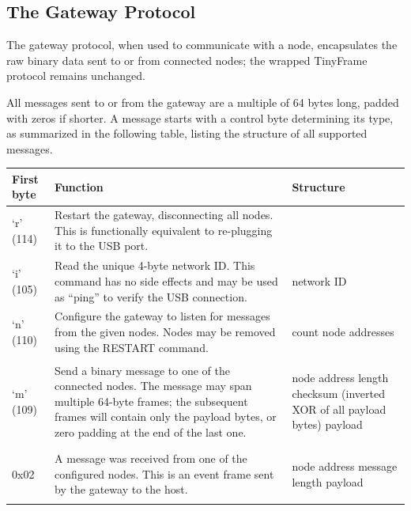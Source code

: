 \subsection{The Gateway Protocol} \label{sec:gw_protocol}

The gateway protocol, when used to communicate with a node, encapsulates the raw binary data sent to or from connected nodes; the wrapped TinyFrame protocol remains unchanged.

All messages sent to or from the gateway are a multiple of 64 bytes long, padded with zeros if shorter. A message starts with a control byte determining its type, as summarized in the following table, listing the structure of all supported messages.

\newpage
{
\tabulinesep=5pt
\begin{longtabu} to 
	\toprule
	\textbf{First byte} & \textbf{Function} & \textbf{Structure} \\
	\midrule
	\endhead

	\bottomrule
	\endfoot

	`r' (114) &
	Restart the gateway, disconnecting all nodes. This is functionally equivalent to re-plugging it to the USB port.
	& \\

	`i' (105) &
	Read the unique 4-byte network ID. This command has no side effects and may be used as ``ping'' to verify the USB connection. &
	\begin{cmdresp}
		 network ID
	\end{cmdresp}
	\\

	`n' (110) &
	Configure the gateway to listen for messages from the given nodes.
	Nodes may be removed using the RESTART command.
	&
	\begin{cmdreq}
		 count
		 node addresses
	\end{cmdreq}
	\\

	`m' (109)&
	\cname{SEND\_MSG}
	Send a binary message to one of the connected nodes. The message may span multiple 64-byte frames; the subsequent frames will contain only the payload bytes, or zero padding at the end of the last one.
	& \begin{cmdreq}
		 node address
		 length
		 checksum (inverted XOR of all payload bytes)
		 payload
	\end{cmdreq} \\

	0x02 &
	A message was received from one of the configured nodes. This is an event frame sent by the gateway to the host.
	& \begin{cmdpld}
		 node address
		 message length
		 payload
	\end{cmdpld} \\

\end{longtabu}
}

